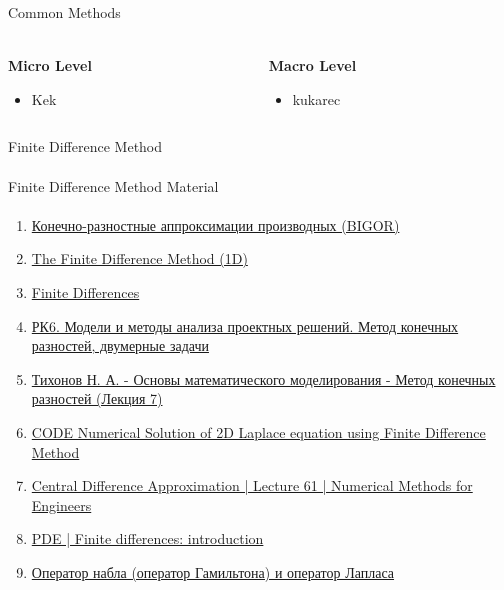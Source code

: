 \documentclass[aspectratio=169]{beamer}
\begin{document}
\begin{frame}[t]{Common Methods}
    \framesubtitle{}
    \begin{columns}[T,onlytextwidth]
        \begin{column}{0.49\textwidth}
            \centering \textbf{Micro Level}
            \begin{itemize}
                \item Kek
            \end{itemize}
        \end{column}
        \begin{column}{0.49\textwidth}
            \centering \textbf{Macro Level}
            \begin{itemize}
                \item kukarec
            \end{itemize}
        \end{column}
    \end{columns}
\end{frame}

\begin{frame}[t]{Finite Difference Method}
    \framesubtitle{}

\end{frame}

\begin{frame}[t]{Finite Difference Method Material}
    \framesubtitle{}
    \scriptsize
    \begin{enumerate}
        \item \href{http://bigor.bmstu.ru/?cnt/?doc=Mkr/\%CA\%D0.mod/?cou=Mkr/base.cou}{Конечно-разностные аппроксимации производных (BIGOR)}
        \item \href{https://youtu.be/to82dv2SX28}{The Finite Difference Method (1D)}
        \item \href{https://www.youtube.com/watch?v=YotrBNLFen0}{Finite Differences}
        \item \href{https://www.youtube.com/watch?v=zSz-c4lFAuQ&t=5s}{РК6. Модели и методы анализа проектных решений. Метод конечных разностей, двумерные задачи}
        \item \href{https://youtu.be/gIOLPO16mEU}{Тихонов Н. А. - Основы математического моделирования - Метод конечных разностей (Лекция 7)}
        \item \href{https://youtu.be/DWCNVF9oMkw}{CODE Numerical Solution of 2D Laplace equation using Finite Difference Method}
        \item \href{https://youtu.be/Tfo12ylAMso}{Central Difference Approximation | Lecture 61 | Numerical Methods for Engineers}
        \item \href{https://www.youtube.com/watch?v=g3Xw1r7QGOE}{PDE | Finite differences: introduction}
        \item \href{https://youtu.be/FS6FcaX1O0U}{Оператор набла (оператор Гамильтона) и оператор Лапласа}
    \end{enumerate}
\end{frame}
\end{document}
